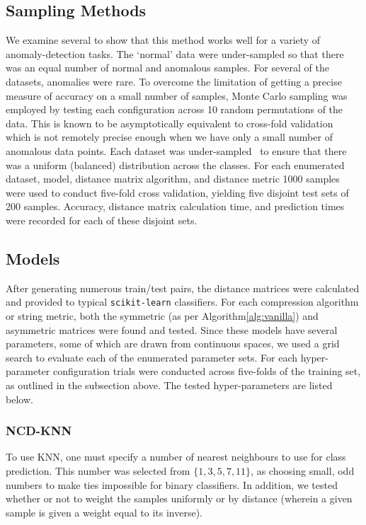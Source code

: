 \documentclass[conference]{IEEEtran}
\begin{document}
\subsection{Sampling Methods}
We examine several to show that this method works well for a variety of anomaly-detection tasks. The `normal' data were under-sampled so that there was an equal number of normal and anomalous samples. For several of the datasets, anomalies were rare. 
To overcome the limitation of getting a precise measure of accuracy on a small number of samples, Monte Carlo sampling was employed by testing each configuration across 10 random permutations of the data. 
This is known to be asymptotically equivalent to cross-fold validation~\cite{shan2022monte} which is not remotely precise enough when we have only a small number of anomalous data points. 
Each dataset was under-sampled~\cite{} to ensure that there was a uniform (balanced) distribution across the classes. 
For each enumerated dataset, model, distance matrix algorithm, and distance metric 1000 samples were used to conduct five-fold cross validation, yielding five disjoint test sets of 200 samples. 
Accuracy, distance matrix calculation time, and prediction times were recorded for each of these disjoint sets.


\subsection{Models}
After generating numerous train/test pairs, the distance matrices were calculated and provided to typical \texttt{scikit-learn} classifiers. For each compression algorithm or string metric, both the symmetric (as per  Algorithm\ref{alg:vanilla}) and asymmetric matrices were found and tested. Since these models have several parameters, some of which are drawn from continuous spaces, we used a grid search to evaluate each of the enumerated parameter sets. 
For each hyper-parameter configuration trials were conducted across five-folds of the training set, as outlined in the subsection above. 
The tested hyper-parameters are listed below.

\label{models}
\subsubsection{NCD-KNN}
To use KNN, one must specify a number of nearest neighbours to use for class prediction. This number was selected from $\{1,3,5,7,11\}$, as choosing small, odd numbers to make ties impossible for binary classifiers. In addition, we tested whether or not to weight the samples uniformly or by distance (wherein a given sample is given a weight equal to its inverse). 
\end{document}
